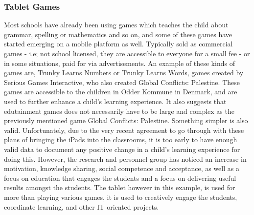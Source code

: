 \subsubsection{Tablet Games}

Most schools have already been using games which teaches the child about grammar, spelling or mathematics and so on, and some of these games have started emerging on a mobile platform as well.
Typically sold as commercial games - i.e; not school licensed, they are accessible to everyone for a small fee - or in some situations, paid for via advertisements.
An example of these kinds of games are, Trunky Learns Numbers or Trunky Learns Words, games created by Serious Games Interactive, who also created Global Conflicts: Palestine.
These games are accessible to the children in Odder Kommune in Denmark, and are used to further enhance a child's learning experience.\cite{odderipad}
It also suggests that edutainment games does not necessarily have to be large and complex as the previously mentioned game Global Conflicts: Palestine.
Something simpler is also valid.
Unfortunately, due to the very recent agreement to go through with these plans of bringing the iPads into the classrooms, it is too early to have enough valid data to document any positive change in a child's learning experience for doing this.
However, the research and personnel group has noticed an increase in motivation, knowledge sharing, social competence and acceptance, as well as a focus on education that engages the students and a focus on delivering useful results amongst the students.\cite{odderipadpjece}
The tablet however in this example, is used for more than playing various games, it is used to creatively engage the students, coordinate learning, and other IT oriented projects.\cite{odderipadpjece}